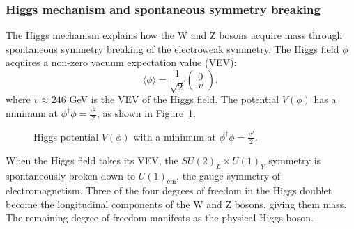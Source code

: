         \subsubsection{Higgs mechanism and spontaneous symmetry breaking}
            The Higgs mechanism explains how the W and Z bosons acquire mass through spontaneous symmetry breaking of the electroweak symmetry.
            The Higgs field \(\phi\) acquires a non-zero vacuum expectation value (VEV):
            \[
            \langle \phi \rangle = \frac{1}{\sqrt{2}} \begin{pmatrix} 0 \\ v \end{pmatrix},
            \]
            where \(v \approx 246\) GeV is the VEV of the Higgs field.
            The potential \(V(\phi)\) has a minimum at \(\phi^\dagger \phi = \frac{v^2}{2}\), as shown in Figure~\ref{fig:higgs_potential}.
            \begin{figure}[hbtp]
                \centering
                \caption{Higgs potential $V(\phi)$ with a minimum at $\phi^\dagger \phi = \frac{v^2}{2}$.}
                \label{fig:higgs_potential}
            \end{figure}
            When the Higgs field takes its VEV, the \(SU(2)_L \times U(1)_Y\) symmetry is spontaneously 
            broken down to \(U(1)_{\text{em}}\), the gauge symmetry of electromagnetism.
            Three of the four degrees of freedom in the Higgs doublet become the longitudinal 
            components of the W and Z bosons, giving them mass. 
            The remaining degree of freedom manifests as the physical Higgs boson.
        
